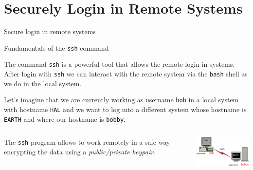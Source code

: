 \section{Securely Login in Remote Systems}
\begin{frame}[t,fragile]{Secure login in remote systems}
  \begin{block}{Fundamentals of the \alert{\texttt{ssh}} command}
    {\footnotesize
 The command \alert{\texttt{ssh}} is a powerful tool that allows the remote login in systems. After login with \texttt{\alert{ssh}} we can interact with the remote system via the \texttt{bash} shell as we do in the local system. 

 Let's imagine that we are currently working as username \texttt{\alert{bob}} in a local system with hostname \texttt{\alert{HAL}} and we want to log into a different system whose hostname is \texttt{\alert{EARTH}} and where our hostname is \texttt{\alert{bobby}}. 

  \begin{columns}
The  \texttt{ssh} program allows to work remotely in a safe way encrypting the data using a \emph{public/private keypair}.
\begin{center}
\includegraphics[angle=0,width=5cm]{./Figs/Diagram2.eps}%
\end{center}
\end{columns}
}
  \end{block}
  
\end{frame}
